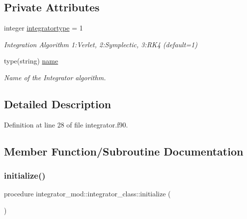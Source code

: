 \subsection*{Private Attributes}
\begin{DoxyCompactItemize}
\item 
integer \mbox{\hyperlink{structintegrator__mod_1_1integrator__class_a806db7072f1822bd3b10b3f8ae83c33a}{integratortype}} = 1
\begin{DoxyCompactList}\small\item\em Integration Algorithm 1\+:Verlet, 2\+:Symplectic, 3\+:R\+K4 (default=1) \end{DoxyCompactList}\item 
type(string) \mbox{\hyperlink{structintegrator__mod_1_1integrator__class_a5f8a28319eb6f1558ee1d320cdf90cf6}{name}}
\begin{DoxyCompactList}\small\item\em Name of the Integrator algorithm. \end{DoxyCompactList}\end{DoxyCompactItemize}


\subsection{Detailed Description}


Definition at line 28 of file integrator.\+f90.



\subsection{Member Function/\+Subroutine Documentation}
\mbox{\label{structintegrator__mod_1_1integrator__class_a1becdc8a710c8f765e967600f51b5401}} 
\subsubsection{\texorpdfstring{initialize()}{initialize()}}
{\footnotesize\ttfamily procedure integrator\+\_\+mod\+::integrator\+\_\+class\+::initialize (\begin{DoxyParamCaption}{ }\end{DoxyParamCaption})\hspace{0.3cm}{\ttfamily [private]}}



